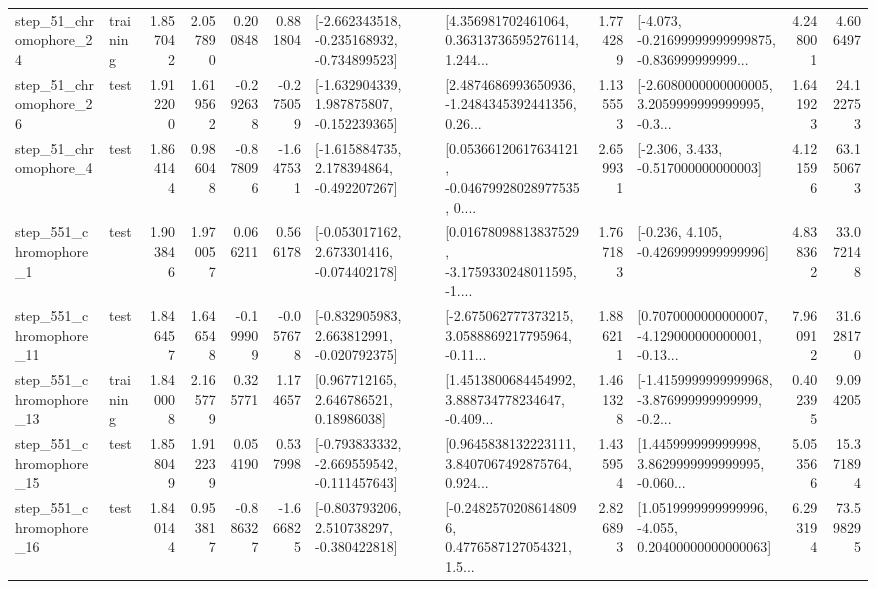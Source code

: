 \begin{tabular}{llrrrrllrlrr}
   step\_51\_chromophore\_24 &  training &      1.857042 &    2.057890 &      0.200848 &  0.881804 &  [-2.662343518, -0.235168932, -0.734899523] &  [4.356981702461064, 0.36313736595276114, 1.244... &       1.774289 &  [-4.073, -0.21699999999999875, -0.836999999999... &            4.248001 &          4.606497 \\
   step\_51\_chromophore\_26 &      test &      1.912200 &    1.619562 &     -0.292638 & -0.275059 &   [-1.632904339, 1.987875807, -0.152239365] &  [2.4874686993650936, -1.2484345392441356, 0.26... &       1.135553 &  [-2.6080000000000005, 3.2059999999999995, -0.3... &            1.641923 &         24.122753 \\
    step\_51\_chromophore\_4 &      test &      1.864144 &    0.986048 &     -0.878096 & -1.647531 &   [-1.615884735, 2.178394864, -0.492207267] &  [0.05366120617634121, -0.04679928028977535, 0.... &       2.659931 &                [-2.306, 3.433, -0.517000000000003] &            4.121596 &         63.150673 \\
   step\_551\_chromophore\_1 &      test &      1.903846 &    1.970057 &      0.066211 &  0.566178 &   [-0.053017162, 2.673301416, -0.074402178] &  [0.01678098813837529, -3.1759330248011595, -1.... &       1.767183 &               [-0.236, 4.105, -0.4269999999999996] &            4.838362 &         33.072148 \\
  step\_551\_chromophore\_11 &      test &      1.846457 &    1.646548 &     -0.199909 & -0.057678 &   [-0.832905983, 2.663812991, -0.020792375] &  [-2.675062777373215, 3.0588869217795964, -0.11... &       1.886211 &  [0.7070000000000007, -4.129000000000001, -0.13... &            7.960912 &         31.628170 \\
  step\_551\_chromophore\_13 &  training &      1.840008 &    2.165779 &      0.325771 &  1.174657 &      [0.967712165, 2.646786521, 0.18986038] &  [1.4513800684454992, 3.888734778234647, -0.409... &       1.461328 &  [-1.4159999999999968, -3.876999999999999, -0.2... &            0.402395 &          9.094205 \\
  step\_551\_chromophore\_15 &      test &      1.858049 &    1.912239 &      0.054190 &  0.537998 &  [-0.793833332, -2.669559542, -0.111457643] &  [0.9645838132223111, 3.8407067492875764, 0.924... &       1.435954 &  [1.445999999999998, 3.8629999999999995, -0.060... &            5.053566 &         15.371894 \\
  step\_551\_chromophore\_16 &      test &      1.840144 &    0.953817 &     -0.886327 & -1.666825 &   [-0.803793206, 2.510738297, -0.380422818] &  [-0.24825702086148096, 0.4776587127054321, 1.5... &       2.826893 &  [1.0519999999999996, -4.055, 0.20400000000000063] &            6.293194 &         73.598295 \\

\end{tabular}
